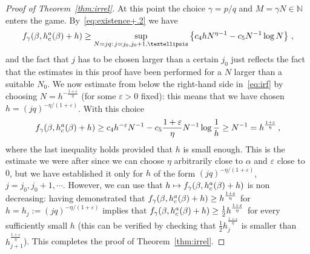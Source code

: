 \documentclass[11pt]{article}
\theoremstyle{definition}
\numberwithin{equation}{section}
\numberwithin{figure}{section}
\numberwithin{table}{section}
\newcommand{\ga}{\alpha}
\newcommand{\gb}{\beta}
\newcommand{\gep}{\varepsilon}
\newcommand{\tf}{\textsc{f}} %
\newcommand{\bbN}{\ensuremath{\mathbb{N}}}
\begin{document}
\begin{proof}[Proof of Theorem~\ref{thm:irrel}]
At this point the choice $\gamma=p/q$ and $M=\gamma N \in \bbN$ enters the game. By~\eqref{eq:existence+.2} we have
\begin{equation}\label{eq:irf}
\tf_{\gamma}(\gb,h_c^a(\gb) +h) \geq \sup_{N=jq :\,j =j_0, j_0+1, \ldots} \left\{ c_4 h N^{\eta-1} - c_5 N^{-1} \log N \right\}\,,
\end{equation}
and the fact that $j$ has to be chosen larger than a certain $j_0$ just reflects the fact that the estimates in this proof have been performed for a $N$ larger than a suitable $N_0$. We now estimate from below the right-hand side in~\eqref{eq:irf} by choosing $N= h^{-\frac{1+\gep}{\eta}}$ (for some $\gep>0$ fixed): this means that we have chosen $h=(jq)^{-\eta/(1+\gep)}$. With this choice
\begin{equation}
\tf_{\gamma}(\gb,h_c^a(\gb) +h) \geq c_4 h^{-\gep} N^{-1} - c_5 \frac{1+\gep}{\eta} N^{-1} \log \frac 1h \geq N^{-1} = h^{\frac{1+\gep}{\eta}}\,,
\end{equation}
where the last inequality holds provided that $h$ is small enough. This is the estimate we were after since we can choose $\eta$ arbitrarily close to $\ga$ and $\gep$ close to $0$, but we have established it only for $h$ of the form $(jq)^{-\eta/(1+\gep)}$, $j=j_0, j_0+1, \cdots$. However, we can use that $h\mapsto \tf_{\gamma}(\gb,h_c^a(\gb) +h)$ is non decreasing: having demonstrated that $\tf_{\gamma}(\gb,h_c^a(\gb) +h)\ge h^{\frac{1+\gep}{\eta}}$ for $h=h_j:=(jq)^{-\eta/(1+\gep)}$ implies that $\tf_{\gamma}(\gb,h_c^a(\gb) +h)\ge \tfrac12 h^{\frac{1+\gep}{\eta}}$ for every sufficiently small $h$ (this can be verified by checking that $\tfrac12 h_j^{\frac{1+\gep}{\eta}}$ is smaller than $h_{j+1}^{\frac{1+\gep}{\eta}}$). This completes the proof of Theorem~\ref{thm:irrel}.
\end{proof}
\end{document}
